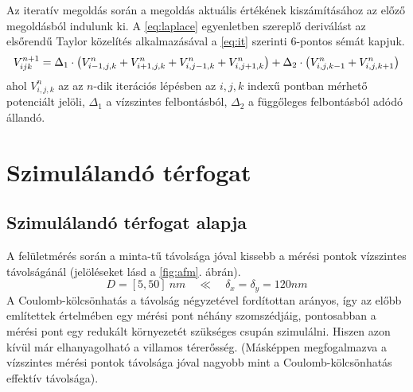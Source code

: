 	Az iteratív megoldás során a megoldás aktuális értékének kiszámításához az előző megoldásból indulunk ki.
	A \eqref{eq:laplace} egyenletben szereplő deriválást az elsőrendű Taylor közelítés alkalmazásával a
	\eqref{eq:it} szerinti 6-pontos sémát kapjuk.
	\begin{equation} \label{eq:it} 
		V_{ijk}^{n+1} = \\ \Delta_1 \cdot \left(V_{i-1,j,k}^n+V_{i+1,j,k}^n
		+V_{i,j-1,k}^n+V_{i,j+1,k}^n\right)+ \\
						\Delta_2 \cdot \left(V_{i,j,k-1}^n+V_{i,j,k+1}^n\right)
	\end{equation}
	ahol $V_{i,j,k}^n$ az az $n$-dik iterációs lépésben az $i,j,k$ indexű
	pontban mérhető potenciált jelöli, $\Delta_1$ a vízszintes felbontásból,
	$\Delta_2$ a függőleges felbontásból adódó állandó.
	

	

\section{Szimulálandó térfogat} \label{sec:sim_terfogat}
\subsection{Szimulálandó térfogat alapja}
	A felületmérés során a minta-tű távolsága jóval kissebb a mérési pontok vízszintes távolságánál
	(jelöléseket lásd a \ref{fig:afm}.	ábrán).
	\begin{equation}
	D=[5,50]\ nm\quad \ll \quad \delta_x=\delta_y=120nm 
	\end{equation}
	A Coulomb-kölcsönhatás a távolság négyzetével fordítottan arányos, így az előbb említettek értelmében egy mérési pont néhány 
	szomszédjáig, pontosabban a mérési pont egy redukált környezetét szükséges csupán szimulálni.
	Hiszen azon kívül már elhanyagolható a villamos térerősség.
	(Másképpen megfogalmazva a vízszintes mérési pontok távolsága jóval nagyobb mint a Coulomb-kölcsönhatás effektív távolsága).
	
